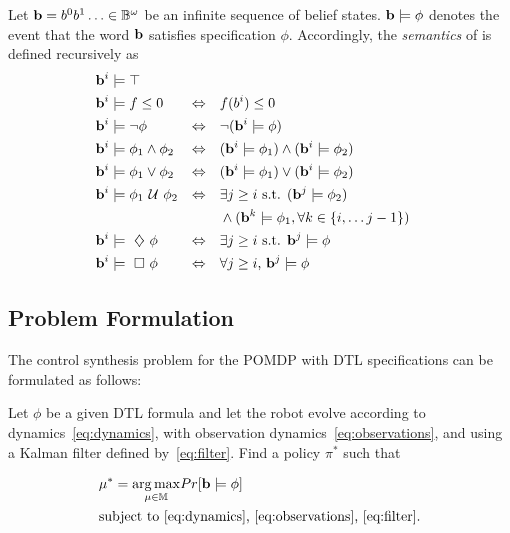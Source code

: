 \documentclass[letterpaper]{article} %
\begin{document}
    \begin{definition}
    \label{def:gdtl-semantics}
    Let $\mathbf{b} = b^0b^1 \ldots \in \mathbb{B}^{\omega}$
    be an infinite sequence of belief states. $\mathbf{b} \models \phi$ denotes the event that the word $\mathbf{b}$ satisfies specification $\phi$. Accordingly, the {\em semantics} of \DTL is defined recursively as
    \begin{align*}
    &\BF{b}^i \models  \top  & \\
    &\BF{b}^i \models f \leq 0 & \Equiv\quad & f(b^i) \leq 0\\ %
    &\BF{b}^i \models \notltl \phi & \Equiv\quad & \notltl (\BF{b}^i \models \phi) \\
    &\BF{b}^i \models \phi_1 \andltl  \phi_2  & \Equiv\quad & ( \BF{b}^i \models \phi_1 ) \andltl ( \BF{b}^i \models \phi_2 ) \\
    &\BF{b}^i \models \phi_1 \orltl  \phi_2  & \Equiv\quad & ( \BF{b}^i \models \phi_1 ) \orltl ( \BF{b}^i \models \phi_2 ) \\
    &\BF{b}^i \models  \phi_1 \Until \phi_2 & \Equiv\quad & \exists j \geq i \text{ s.t. } ( \BF{b}^j \models \phi_2 ) \\
    & & & \andltl (\BF{b}^k \models \phi_1, \forall k \in \{i, \ldots j-1\})\\
    &\BF{b}^i \models \Event \phi  & \Equiv\quad & \exists j \geq i \text{ s.t. } \BF{b}^j \models \phi \\
    &\BF{b}^i \models \Always \phi  & \Equiv\quad & \forall j \geq i \text{, } \BF{b}^j \models \phi
    \end{align*}
    
    \end{definition}
    
    \subsection{Problem Formulation}\label{sec:prob}
    
    The control synthesis problem for the POMDP with DTL specifications can be formulated as follows:
    
    \begin{problem}
    \label{pb:mpp}
    Let $\phi$ be a given DTL formula and let the robot
    evolve according to dynamics~\eqref{eq:dynamics},
    with observation dynamics~\eqref{eq:observations},
    and using a Kalman filter defined by~\eqref{eq:filter}.
    Find a policy $\pi^*$ such that 
    
    \begin{equation}
    \label{eq:mpp}
    \begin{aligned}
    &\mu^* = \underset{\mu \in \mathbb{M}}{\arg \max}Pr[\mathbf{b} \models \phi] \\
    &\text{subject to~\eqref{eq:dynamics},~\eqref{eq:observations},~\eqref{eq:filter}.}
    \end{aligned}
    \end{equation}
    
    \end{problem}
    
\end{document}
